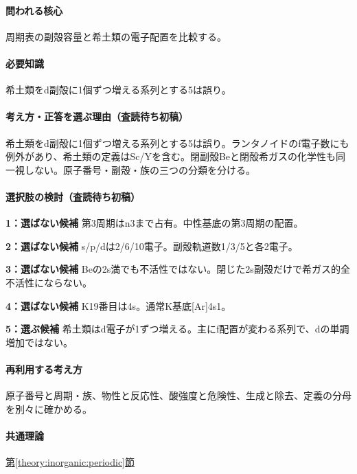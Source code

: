 \paragraph{問われる核心} 周期表の副殻容量と希土類の電子配置を比較する。

\paragraph{必要知識} 希土類をd副殻に1個ずつ増える系列とする5は誤り。

\paragraph{考え方・正答を選ぶ理由（査読待ち初稿）} 希土類をd副殻に1個ずつ増える系列とする5は誤り。ランタノイドのf電子数にも例外があり、希土類の定義はSc/Yを含む。閉副殻Beと閉殻希ガスの化学性も同一視しない。原子番号・副殻・族の三つの分類を分ける。

\paragraph{選択肢の検討（査読待ち初稿）}\mbox{}\par

\noindent\textbf{1：選ばない候補} 第3周期はn3まで占有。中性基底の第3周期の配置。\par

\noindent\textbf{2：選ばない候補} s/p/dは2/6/10電子。副殻軌道数1/3/5と各2電子。\par

\noindent\textbf{3：選ばない候補} Beの2s満でも不活性ではない。閉じた2s副殻だけで希ガス的全不活性にならない。\par

\noindent\textbf{4：選ばない候補} K19番目は4s。通常K基底[Ar]4s1。\par

\noindent\textbf{5：選ぶ候補} 希土類はd電子が1ずつ増える。主にf配置が変わる系列で、dの単調増加ではない。\par

\paragraph{再利用する考え方} 原子番号と周期・族、物性と反応性、酸強度と危険性、生成と除去、定義の分母を別々に確かめる。

\paragraph{共通理論} \hyperref[theory:inorganic:periodic]{第\ref*{theory:inorganic:periodic}節}

